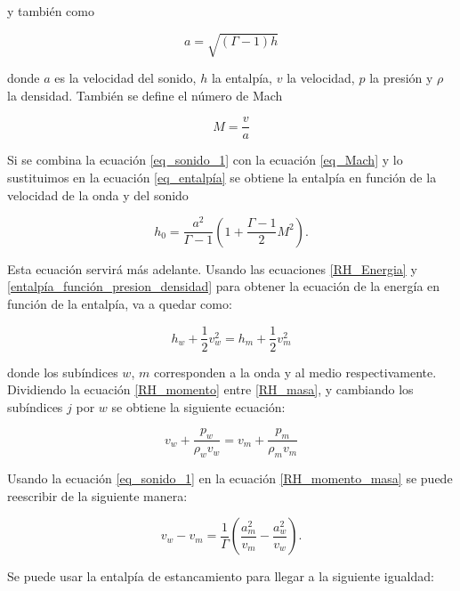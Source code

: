 \documentclass[12pt,a4paper]{book}
\begin{document}
\noindent y también como 

\begin{equation} \label{eq_sonido_2}
	a = \sqrt{(\Gamma-1) h}
\end{equation}

\noindent donde $a$ es la velocidad del sonido, $h$ la entalpía, $v$ la velocidad, $p$ la presión y $\rho$ la densidad. También se define el número de Mach 

\begin{equation} \label{eq_Mach}
	M = \frac{v}{a}
\end{equation}

Si se combina la ecuación \ref{eq_sonido_1} con la ecuación \ref{eq_Mach} y lo sustituimos en la ecuación \ref{eq_entalpía} se obtiene la entalpía en función de la velocidad de la onda y del sonido

\begin{equation} \label{h_0_función_aire_mach}
	h_0 = \frac{a^2}{\Gamma - 1} \left( 1 + \frac{\Gamma - 1}{2} M^2 \right).
\end{equation}

\noindent Esta ecuación servirá más adelante. Usando las ecuaciones  
\ref{RH_Energia} y \ref{entalpía_función_presion_densidad} para obtener la ecuación de la energía en función de la entalpía, va a quedar como:

\begin{equation}\label{RH_entalpía}
  h_w +\frac{1}{2}v_w^2 = h_m +\frac{1}{2}v_m^2
\end{equation} 

\noindent donde los subíndices $w$, $m$ corresponden a la onda y al medio respectivamente. Dividiendo la ecuación \ref{RH_momento} entre \ref{RH_masa}, y cambiando los 
subíndices $j$ por $w$ se obtiene la siguiente ecuación: 

\begin{equation} \label{RH_momento_masa}
  v_w + \frac{p_w}{\rho_w v_w} = v_m + \frac{p_m}{\rho_m v_m}
\end{equation}

\noindent Usando la ecuación \ref{eq_sonido_1} en la ecuación \ref{RH_momento_masa} se puede reescribir de 
la siguiente manera:

\begin{equation} \label{eq_diferencia_velocidades}
  v_w-v_m = \frac{1}{\Gamma} \left(\frac{a_m^2}{v_m} - \frac{a_w^2}{v_w} \right).
\end{equation}

Se puede usar la entalpía de estancamiento para llegar a la siguiente igualdad:
\end{document}
